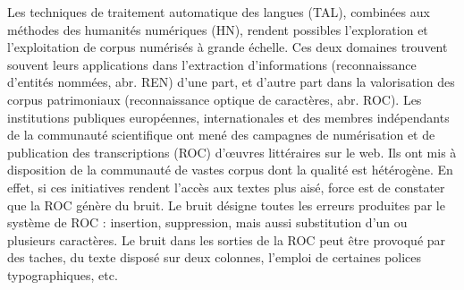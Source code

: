 Les techniques de traitement automatique des langues (TAL), combinées aux méthodes des humanités numériques (HN), rendent possibles l'exploration et l'exploitation de corpus numérisés à grande échelle. Ces deux domaines trouvent souvent leurs applications dans l'extraction d'informations (reconnaissance d'entités nommées, abr. REN) d'une part, et d'autre part dans la valorisation des corpus patrimoniaux (reconnaissance optique de caractères, abr. ROC).
Les institutions publiques européennes, internationales et des membres indépendants de la communauté scientifique
ont mené des campagnes de numérisation et de publication des transcriptions (ROC) d’œuvres littéraires sur le web. Ils ont mis à disposition de la communauté de vastes corpus dont la qualité est hétérogène.
En effet, si ces initiatives rendent l'accès aux textes plus aisé, force est de constater que la ROC génère du bruit. Le bruit désigne toutes les erreurs produites par le système de ROC : insertion, suppression, mais aussi substitution d'un ou plusieurs caractères. Le bruit dans les sorties de la ROC peut être provoqué par des taches, du texte disposé sur deux colonnes, l'emploi de certaines polices typographiques, etc.


%

